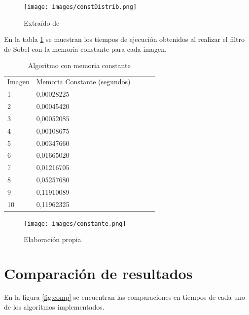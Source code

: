 \documentclass[10pt,journal,compsoc]{IEEEtran}
\begin{document}
\begin{figure}[ht]
    \begin{center}
        \texttt{[image: images/constDistrib.png]}
    \end{center}
    \caption{Extraído de \cite{kirk2016programming}}\label{fig:constantDistrib}
\end{figure}


En la tabla \ref{tab:const} se muestran los tiempos de ejecución obtenidos al realizar el filtro de Sobel con la memoria constante para cada imagen. 

\begin{table}[ht]
\centering
\caption{Algoritmo con memoria constante}
\label{tab:const}
\begin{tabular}{lllll}
Imagen & Memoria Constante (segundos) &  &  &  \\
1      & 0,00028225                   &  &  &  \\
2      & 0,00045420                   &  &  &  \\
3      & 0,00052085                   &  &  &  \\
4      & 0,00108675                   &  &  &  \\
5      & 0,00347660                   &  &  &  \\
6      & 0,01665020                   &  &  &  \\
7      & 0,01216705                   &  &  &  \\
8      & 0,05257680                   &  &  &  \\
9      & 0,11910089                   &  &  &  \\
10     & 0,11962325                   &  &  & 
\end{tabular}
\end{table}

\begin{figure}[ht]
    \begin{center}
        \texttt{[image: images/constante.png]}
    \end{center}
    \caption{Elaboración propia}
\end{figure}


\section{Comparación de resultados}

En la figura \ref{fig:comp} se encuentran las comparaciones en tiempos de cada uno de los algoritmos implementados.
\end{document}
